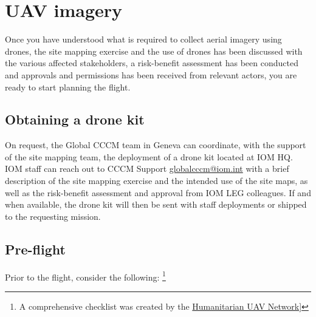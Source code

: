 \documentclass[
  a4paper,
  onecolumn,
  oneside]{book}
\begin{document}
\hypertarget{uav-imagery}{%
\chapter{UAV imagery}\label{uav-imagery}}

Once you have understood what is required to collect aerial imagery
using drones, the site mapping exercise and the use of drones has been
discussed with the various affected stakeholders, a risk-benefit
assessment has been conducted and approvals and permissions has been
received from relevant actors, you are ready to start planning the
flight.

\hypertarget{obtaining-a-drone-kit}{%
\section{Obtaining a drone kit}\label{obtaining-a-drone-kit}}

\begin{tcolorbox}[enhanced jigsaw, opacitybacktitle=0.6, colbacktitle=quarto-callout-note-color!10!white, breakable, coltitle=black, title=\textcolor{quarto-callout-note-color}{\faInfo}\hspace{0.5em}{Note for IOM staff}, toprule=.15mm, bottomrule=.15mm, colback=white, left=2mm, toptitle=1mm, bottomtitle=1mm, arc=.35mm, colframe=quarto-callout-note-color-frame, titlerule=0mm, opacityback=0, rightrule=.15mm, leftrule=.75mm]

On request, the Global CCCM team in Geneva can coordinate, with the
support of the site mapping team, the deployment of a drone kit located
at IOM HQ. IOM staff can reach out to CCCM Support
\url{globalcccm@iom.int} with a brief description of the site mapping
exercise and the intended use of the site maps, as well as the
risk-benefit assessment and approval from IOM LEG colleagues. If and
when available, the drone kit will then be sent with staff deployments
or shipped to the requesting mission.

\end{tcolorbox}

\hypertarget{pre-flight}{%
\section{Pre-flight}\label{pre-flight}}

Prior to the flight, consider the following: \footnote{A comprehensive
  checklist was created by the
  \href{https://docs.google.com/document/d/1av3GvsAQOxttCXKAgYCBf8tpv8lU72P1u4voAQrhTNw/edit}{Humanitarian
  UAV Network}{]}}
\end{document}

